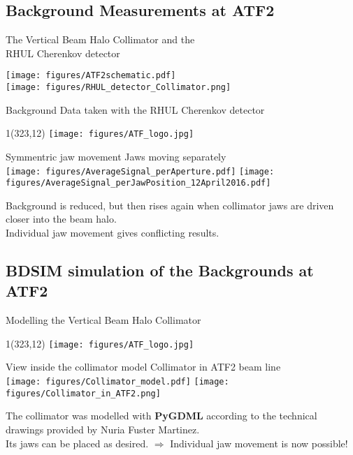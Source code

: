 \documentclass[xcolor={dvipsnames}]{beamer}
\newcommand{\ATFlogo}{
  \setlength{\TPHorizModule}{1pt}
  \setlength{\TPVertModule}{1pt}
  \begin{textblock}{1}(323,12)
   \texttt{[image: figures/ATF\_logo.jpg]}
  \end{textblock}
}
\begin{document}
\subsection{Background Measurements at ATF2}
\begin{frame}{The Vertical Beam Halo Collimator and the\\RHUL Cherenkov detector}

\begin{center}
\texttt{[image: figures/ATF2schematic.pdf]}\\
  \texttt{[image: figures/RHUL\_detector\_Collimator.png]}
\end{center}
\end{frame}

\begin{frame}{Background Data taken with the RHUL Cherenkov detector}
\ATFlogo
\begin{center}
 Symmentric jaw movement \hspace*{2.5cm} Jaws moving separately\\
\vspace*{0.2cm}
 \texttt{[image: figures/AverageSignal\_perAperture.pdf]}
  \texttt{[image: figures/AverageSignal\_perJawPosition\_12April2016.pdf]}
\end{center}
Background is reduced, but then rises again when collimator jaws are driven closer into the beam halo.\\
Individual jaw movement gives conflicting results.
\end{frame}

\subsection{BDSIM simulation of the Backgrounds at ATF2}
\begin{frame}{Modelling the Vertical Beam Halo Collimator}
\ATFlogo
\begin{center}
View inside the collimator model \hspace*{1cm} Collimator in ATF2 beam line\\
\vspace*{0.2cm}
 \texttt{[image: figures/Collimator\_model.pdf]}
 \texttt{[image: figures/Collimator\_in\_ATF2.png]}
\end{center}
The collimator was modelled with \textbf{PyGDML} according to the technical drawings provided by Nuria Fuster Martinez.\\
Its jaws can be placed as desired.
$\Rightarrow$ Individual jaw movement is now possible!
\end{frame}
\end{document}
